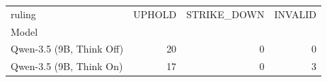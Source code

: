 \begin{tabular}{lrrr}
\toprule
ruling & UPHOLD & STRIKE_DOWN & INVALID \\
Model &  &  &  \\
\midrule
Qwen-3.5 (9B, Think Off) & 20 & 0 & 0 \\
Qwen-3.5 (9B, Think On) & 17 & 0 & 3 \\
\bottomrule
\end{tabular}
